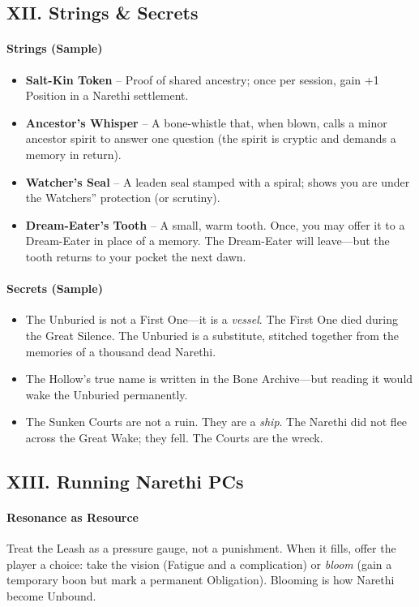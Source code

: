 \documentclass[11pt]{article}
\begin{document}
\subsection*{XII. Strings \& Secrets}
\paragraph{Strings (Sample)}
\begin{itemize}[leftmargin=*,nosep]
    \item \textbf{Salt-Kin Token} -- Proof of shared ancestry; once per session, gain +1 Position in a Narethi settlement.
    \item \textbf{Ancestor's Whisper} -- A bone-whistle that, when blown, calls a minor ancestor spirit to answer one question (the spirit is cryptic and demands a memory in return).
    \item \textbf{Watcher's Seal} -- A leaden seal stamped with a spiral; shows you are under the Watchers'' protection (or scrutiny).
    \item \textbf{Dream-Eater's Tooth} -- A small, warm tooth. Once, you may offer it to a Dream-Eater in place of a memory. The Dream-Eater will leave---but the tooth returns to your pocket the next dawn.
\end{itemize}

\paragraph{Secrets (Sample)}
\begin{itemize}[leftmargin=*,nosep]
    \item The Unburied is not a First One---it is a \textit{vessel}. The First One died during the Great Silence. The Unburied is a substitute, stitched together from the memories of a thousand dead Narethi.
    \item The Hollow's true name is written in the Bone Archive---but reading it would wake the Unburied permanently.
    \item The Sunken Courts are not a ruin. They are a \textit{ship}. The Narethi did not flee across the Great Wake; they fell. The Courts are the wreck.
\end{itemize}

\subsection*{XIII. Running Narethi PCs}
\paragraph{Resonance as Resource} Treat the Leash as a pressure gauge, not a punishment. When it fills, offer the player a choice: take the vision (Fatigue and a complication) or \textit{bloom} (gain a temporary boon but mark a permanent Obligation). Blooming is how Narethi become Unbound.
\end{document}
